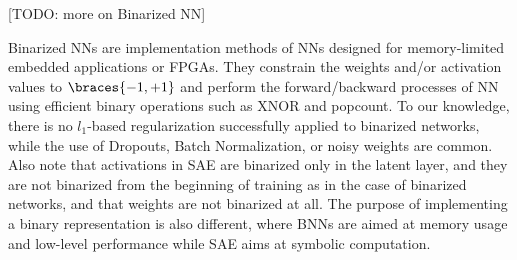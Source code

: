 [TODO: more on Binarized NN]

Binarized NNs \cite{courbariaux2015binaryconnect,HubaraCSEB16,rastegari2016xnor}
 are implementation methods of NNs designed for
memory-limited embedded applications or FPGAs. They constrain the weights and/or activation
values to $\braces{-1,+1}$ and perform the forward/backward processes of NN using
efficient binary operations such as XNOR and popcount.
To our knowledge, there is no $l_1$-based regularization successfully
applied to binarized networks, while the use of Dropouts, Batch Normalization, 
or noisy weights \cite{HubaraCSEB16} are common.
Also note that activations in SAE are binarized only in the latent layer,
and they are not binarized from the beginning of training
 as in the case of binarized networks, and that weights are not binarized at all.
The purpose of implementing a binary representation is also different, where BNNs
are aimed at memory usage and low-level performance while SAE aims at symbolic computation.
